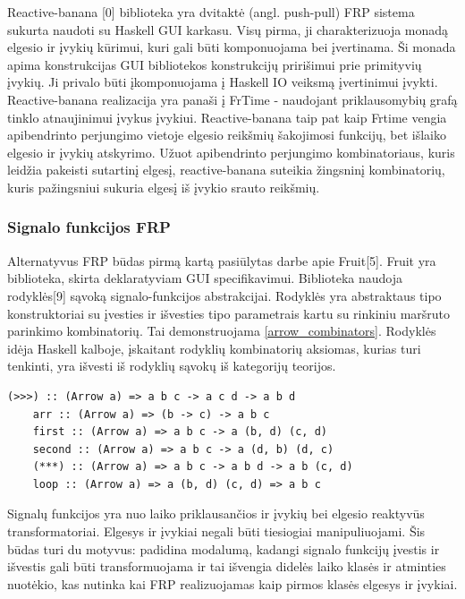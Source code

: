 Reactive-banana [0] biblioteka yra dvitaktė (angl. push-pull) FRP sistema sukurta naudoti su Haskell GUI karkasu. Visų pirma, ji charakterizuoja monadą elgesio ir įvykių kūrimui, kuri gali būti komponuojama bei įvertinama. Ši monada apima konstrukcijas GUI bibliotekos konstrukcijų pririšimui prie primityvių įvykių. Ji privalo būti įkomponuojama į Haskell IO veiksmą įvertinimui įvykti. Reactive-banana realizacija yra panaši į FrTime - naudojant priklausomybių grafą tinklo atnaujinimui įvykus įvykiui. Reactive-banana taip pat kaip Frtime vengia apibendrinto perjungimo vietoje elgesio reikšmių šakojimosi funkcijų, bet išlaiko elgesio ir įvykių atskyrimo. Užuot apibendrinto perjungimo kombinatoriaus, kuris leidžia pakeisti sutartinį elgesį, reactive-banana suteikia žingsninį kombinatorių, kuris pažingsniui sukuria elgesį iš įvykio srauto reikšmių.

\subsubsection{Signalo funkcijos FRP}

Alternatyvus FRP būdas pirmą kartą pasiūlytas darbe apie Fruit[5]. Fruit yra biblioteka, skirta deklaratyviam GUI specifikavimui. Biblioteka naudoja rodyklės[9] sąvoką signalo-funkcijos abstrakcijai. Rodyklės yra abstraktaus tipo konstruktoriai su įvesties ir išvesties tipo parametrais kartu su rinkiniu maršruto parinkimo kombinatorių. Tai demonstruojama \ref{arrow_combinators}. Rodyklės idėja Haskell kalboje, įskaitant rodyklių kombinatorių aksiomas, kurias turi tenkinti, yra išvesti iš rodyklių sąvokų iš kategorijų teorijos.

\begin{lstlisting}[caption=- rodyklių kombinatoriai, label=arrow_combinators]
	(>>>) :: (Arrow a) => a b c -> a c d -> a b d
	arr :: (Arrow a) => (b -> c) -> a b c
	first :: (Arrow a) => a b c -> a (b, d) (c, d)
	second :: (Arrow a) => a b c -> a (d, b) (d, c)
	(***) :: (Arrow a) => a b c -> a b d -> a b (c, d)
	loop :: (Arrow a) => a (b, d) (c, d) => a b c
\end{lstlisting} 

Signalų funkcijos yra nuo laiko priklausančios ir įvykių bei elgesio reaktyvūs transformatoriai. Elgesys ir įvykiai negali būti tiesiogiai manipuliuojami. Šis būdas turi du motyvus: padidina modalumą, kadangi signalo funkcijų įvestis ir išvestis gali būti transformuojama ir tai išvengia didelės laiko klasės ir atminties nuotėkio, kas nutinka kai FRP realizuojamas kaip pirmos klasės elgesys ir įvykiai.

